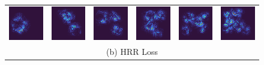 \documentclass[letterpaper]{article} %
\begin{document}
\begin{figure}[!t]
\begin{tabular}{cccccc}
\multicolumn{1}{c}{\includegraphics[width=0.125\columnwidth]{saliency/hrr/edges/edges_1.png}} \hspace{-12pt} &  \multicolumn{1}{c}{\includegraphics[width=0.125\columnwidth]{saliency/hrr/edges/edges_2.png}} \hspace{-12pt} & \multicolumn{1}{c}{\includegraphics[width=0.125\columnwidth]{saliency/hrr/edges/edges_3.png}} \hspace{-12pt} & \multicolumn{1}{c}{\includegraphics[width=0.125\columnwidth]{saliency/hrr/edges/edges_4.png}} \hspace{-12pt} & \multicolumn{1}{c}{\includegraphics[width=0.125\columnwidth]{saliency/hrr/edges/edges_5.png}} \hspace{-12pt} & \multicolumn{1}{c}{\includegraphics[width=0.125\columnwidth]{saliency/hrr/edges/edges_6.png}} \\ 
\multicolumn{6}{c}{(b) HRR Loss} \\


\end{tabular}
\end{figure}
\end{document}
